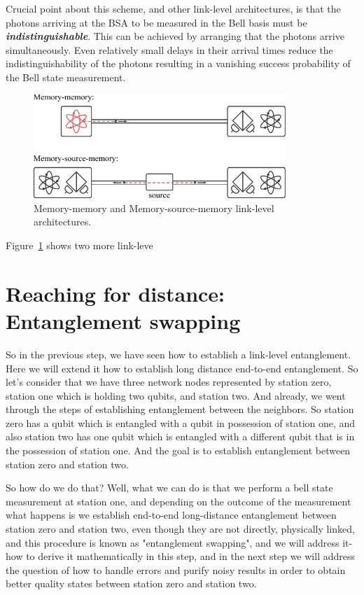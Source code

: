 Crucial point about this scheme, and other link-level architectures, is that the photons arriving at the BSA to be measured in the Bell basis must be \textit{\textbf{indistinguishable}}.
This can be achieved by arranging that the photons arrive simultaneously. 
Even relatively small delays in their arrival times reduce the indistinguishability of the photons resulting in a vanishing success probability of the Bell state measurement.

\begin{figure}[t]
    \centering
    \includegraphics[width=0.85\textwidth]{lesson12/12-2_MM_MSM.pdf}
    \caption[MM and MSM architectures]{Memory-memory and Memory-source-memory link-level architectures.}
    \label{fig:12-2_MM_MSM}
\end{figure}

Figure~\ref{fig:12-2_MM_MSM} shows two more link-leve


\section{Reaching for distance: Entanglement swapping}


So in the previous step, we have seen how to establish a link-level entanglement. Here we will extend it how to establish long distance end-to-end entanglement. So let's consider that we have three network nodes represented by station zero, station one which is holding two qubits, and station two. And already, we went through the steps of establishing entanglement between the neighbors. So station zero has a qubit which is entangled with a qubit in possession of station one, and also station two has one qubit which is entangled with a different qubit that is in the possession of station one. And the goal is to establish entanglement between station zero and station two.

So how do we do that? Well, what we can do is that we perform a bell state measurement at station one, and depending on the outcome of the measurement what happens is we establish end-to-end long-distance entanglement between station zero and station two, even though they are not directly, physically linked, and this procedure is known as "entanglement swapping", and we will address it- how to derive it mathematically in this step, and in the next step we will address the question of how to handle errors and purify noisy results in order to obtain better quality states between station zero and station two.

